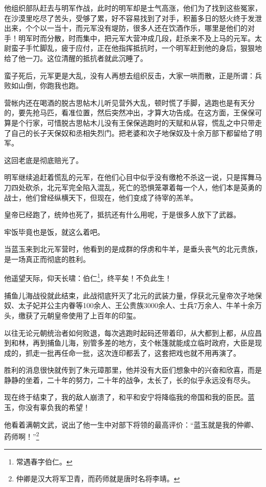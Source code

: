 \begin{multicols}{\theparacolNo}
		他组织部队赶去与明军作战，此时的明军却是士气高涨，他们为了找到这些冤家，在沙漠里吃尽了苦头，受够了累，好不容易找到了对手，积蓄多日的怒火终于发泄出来，个个以一当十，而元军没有堤防，很多人还在饮酒作乐，哪里是他们的对手！明军时而分散，时而集中，把元军大营冲成几段，赶杀来不及上马的元军。太尉蛮子手忙脚乱，疲于应付，正在他指挥抵抗时，一个明军赶到他的身后，狠狠地给了他一刀。这位清醒的抵抗者就此沉睡了。

		蛮子死后，元军更是大乱，没有人再想去组织反击，大家一哄而散，正是所谓：兵败如山倒，你跑我也跑。

		营帐内还在喝酒的脱古思帖木儿听见营外大乱，顿时慌了手脚，逃跑也是有天分的，要先抢马匹，看准位置，然后突然冲出，才算大功告成。在这方面，王保保可算是个行家，可惜脱古思帖木儿没有王保保逃跑时的天赋和从容，慌乱之中只带走了自己的长子天保奴和丞相失烈门。把老婆和次子地保奴及十余万部下都留给了明军。

		这回老底是彻底赔光了。

		明军继续追赶着慌乱的元军，在他们心目中似乎没有缴枪不杀这一说，只是挥舞马刀四处砍杀，北元军完全陷入混乱，死亡的恐惧笼罩着每一个人，他们本是英勇的战士，他们曾经纵横天下，但现在，他们变成了待宰的羔羊。

		皇帝已经跑了，统帅也死了，抵抗还有什么用呢，于是很多人放下了武器。

		牢饭毕竟也是饭，就这么着吧。

		当蓝玉来到北元军营时，他看到的是成群的俘虏和牛羊，是垂头丧气的北元贵族，是一场真正而彻底的胜利。

		他遥望天际，仰天长啸：伯仁\footnote{常遇春字伯仁。}，终平矣！不负此生！

		捕鱼儿海战役就此结束，此战彻底歼灭了北元的武装力量，俘获北元皇帝次子地保奴、太子妃并公主内眷等100余人、王公贵族3000余人、士兵7万余人、牛羊十余万头，缴获了元朝皇帝使用了上百年的印玺。

		以往无论元朝统治者如何败退，每次逃跑时起码还带着印，从大都到上都，从应昌到和林，再到捕鱼儿海，别管多差的地方，支个帐篷就能成立临时政府，大臣是现成的，抓走一批再任命一批，这次连印都丢了，这套把戏也就不用再演了。

		胜利的消息很快就传到了朱元璋那里，他并没有大臣们想象中的兴奋和欣喜，而是静静的坐着，二十年的努力，二十年的战争，太长了，长的似乎永远没有尽头。

		现在终于结束了，我的敌人崩溃了，和平和安宁将降临我的帝国和我的臣民。蓝玉，你没有辜负我的希望！

		他看着满朝文武，说出了他一生中对部下将领的最高评价：“蓝玉就是我的仲卿、药师啊！”\footnote{仲卿是汉大将军卫青，而药师就是唐时名将李靖。}


\end{multicols}
